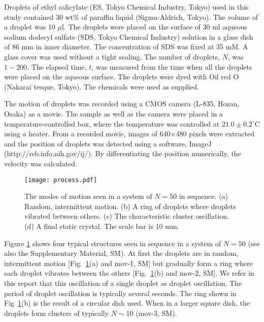 \documentclass[showpacs]{revtex4-1}
\begin{document}
Droplets of ethyl salicylate (ES, Tokyo Chemical Industry, Tokyo) used
in this study contained 30 wt\% of paraffin liquid (Sigma-Aldrich,
Tokyo). The volume of a droplet was 10 $\mu$l. The droplets were placed
on the surface of 30 ml aqueous sodium dodecyl sulfate (SDS, Tokyo
Chemical Industry) solution in a glass dish of 86 mm in inner
diameter. The concentration of SDS was fixed at 35 mM. A glass cover was
used without a tight sealing. The number of droplets, $N$, was
$1-200$. The elapsed time, $t$, was measured from the time when all the
droplets were placed on the aqueous surface. The droplets were dyed with
Oil red O (Nakarai tesque, Tokyo). The chemicals were used as supplied.

The motion of droplets was recorded using a CMOS camera (L-835, Hozan,
Osaka) as a movie. The sample as well as the camera were placed in a
temperature-controlled box, where the temperature was controlled at
$21.0\pm 0.2^\circ$C using a heater. From a recorded movie, images of
640$\times$480 pixels were extracted and the position of droplets was
detected using a software, ImageJ (http://rsb.info.nih.gov/ij/). By
differentiating the position numerically, the velocity was calculated.

 \begin{figure}
  \begin{center}
   \texttt{[image: process.pdf]}
   \caption{The modes of motion seen in a system of $N=50$ in
   sequence. (a) Random, intermittent motion. (b) A ring of droplets where
   droplets vibrated between others. (c) The characteristic cluster
   oscillation. (d) A final static crystal. The scale bar is 10 mm.}
   \label{process}   
  \end{center}
 \end{figure}

Figure \ref{process} shows four typical structures seen in sequence in a
system of $N=50$ (see also the Supplementary Material, SM). At first the
droplets are in random, intermittent motion [Fig.~\ref{process}(a)
and mov-1, SM] but gradually form a ring where each droplet
vibrates between the others [Fig.~\ref{process}(b) and mov-2,
SM]. We refer in this report that this oscillation of a single droplet
as droplet oscillation. The period of droplet oscillation is typically
several seconds. The ring shown in
Fig~\ref{process}(b) is the result of a circular dish used. When in a
larger square dish, the droplets form clusters of typically $N\sim 10$
(mov-3, SM).
\end{document}
